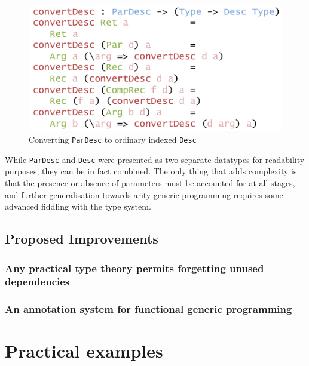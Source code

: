 \documentclass{ituthesis}
\newcommand{\tttype}[1]{\textcolor{type-color}{\texttt{#1}}}
\theoremstyle{break}
\begin{document}
\begin{figure}[ht]
\begin{center}
    \includegraphics[scale=0.5]{Figures/ParDescriptionConversion.png}
\end{center}
\caption{Converting \tttype{ParDesc} to ordinary indexed \tttype{Desc}}
\label{fig:pardesctodesc}
\end{figure}

While \tttype{ParDesc} and \tttype{Desc} were presented as two separate datatypes for readability purposes, they can be in fact combined.
The only thing that adds complexity is that the presence or absence of parameters must be accounted for at all stages, and further generalisation towards arity-generic programming requires some advanced fiddling with the type system.


\section{Proposed Improvements}
\label{sec:ProposedImprovements}

\subsection{Any practical type theory permits forgetting unused dependencies}
\label{sub:Any practical type theory permits forgetting unused dependencies}


\subsection{An annotation system for functional generic programming}
\label{sub:An annotation system for functional generic programming}

\chapter{Practical examples}
\label{cha:PracticalExamples}
\end{document}

